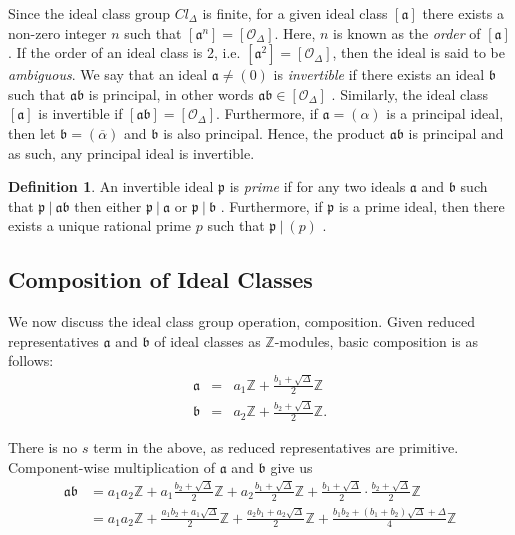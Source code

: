 \documentclass{ucalgthes1}
\theoremstyle{plain}
\theoremstyle{definition}
\newtheorem{defn}[thm]{Definition}
\newcommand{\OO}{\mathcal{O}}
\newcommand{\ZZ}{\mathbb{Z}}
\begin{document}
\noindent
Since the ideal class group $Cl_\Delta$ is finite, for a given ideal class $[\mathfrak a]$ there exists a non-zero integer $n$ such that $[{\mathfrak a}^n] = [\OO_\Delta]$.  Here, $n$ is known as the \emph{order} of $[\mathfrak a]$.  If the order of an ideal class is 2, i.e. $[\mathfrak a^2] = [\OO_\Delta]$, then the ideal is said to be \emph{ambiguous}. We say that an ideal $\mathfrak a \neq (0)$ is \emph{invertible} if there exists an ideal $\mathfrak b$ such that $\mathfrak a \mathfrak b$ is principal, in other words $\mathfrak a \mathfrak b \in [\OO_\Delta]$ \cite[Definition 4.29]{Jac09}. Similarly, the ideal class $[\mathfrak a]$ is invertible if $[\mathfrak a \mathfrak b] = [\OO_\Delta]$.  Furthermore, if $\mathfrak a = (\alpha)$ is a principal ideal, then let $\mathfrak b = (\overline{\alpha})$ and $\mathfrak b$ is also principal.  Hence, the product $\mathfrak a \mathfrak b$ is principal and as such, any principal ideal is invertible.

\begin{defn}
An invertible ideal $\mathfrak p$ is \emph{prime} if for any two ideals $\mathfrak a$ and $\mathfrak b$ such that $\mathfrak p ~|~ \mathfrak a \mathfrak b$ then either $\mathfrak p ~|~ \mathfrak a$ or $\mathfrak p ~|~ \mathfrak b$ \cite[Definition 4.40]{Jac09}.  Furthermore, if $\mathfrak p$ is a prime ideal, then there exists a unique rational prime $p$ such that $\mathfrak p ~|~ (p)$ \cite[Theorem 4.41]{Jac09}.
\end{defn}



\subsection{Composition of Ideal Classes}\label{subsec:idealCompose}

We now discuss the ideal class group operation, composition.  Given reduced representatives $\mathfrak{a}$ and $\mathfrak{b}$ of ideal classes as $\ZZ$-modules, basic composition is as follows:
\begin{eqnarray*}
	\mathfrak{a} & = & a_1 \ZZ + \frac{b_1 + \sqrt{\Delta}}{2} \ZZ \\
	\mathfrak{b} & = & a_2 \ZZ + \frac{b_2 + \sqrt{\Delta}}{2} \ZZ.
\end{eqnarray*}

\noindent
There is no $s$ term in the above, as reduced representatives are primitive.  Component-wise multiplication of $\mathfrak a$ and $\mathfrak b$ give us
\begin{equation}
\begin{split}
	\mathfrak{a} \mathfrak{b} & = a_1a_2 \ZZ + a_1 \frac{b_2 + \sqrt{\Delta}}{2} \ZZ + a_2 \frac{b_1 + \sqrt{\Delta}}{2} \ZZ + \frac{b_1 + \sqrt{\Delta}}{2} \cdot \frac{b_2 + \sqrt{\Delta}}{2} \ZZ \\
	& = a_1a_2 \ZZ + \frac{a_1b_2 + a_1\sqrt{\Delta}}{2} \ZZ + \frac{a_2b_1 + a_2\sqrt{\Delta}}{2} \ZZ + \frac{b_1b_2 + (b_1+b_2)\sqrt{\Delta} + \Delta}{4} \ZZ \label{eq:composeExpanded}
\end{split}
\end{equation}
\end{document}
